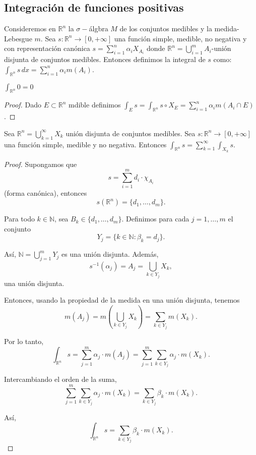 \subsection{Integración de funciones positivas}

\begin{definición}
    Consideremos en $\mathbb{R}^n$ la $\sigma-$álgbra $M$ de los conjuntos medibles y la medida-Lebesgue $m$. Sea $s: \mathbb{R}^n \to [0, +\infty]$ una función simple, medible, no negativa y con representación canónica $s = \sum_{i = 1}^{n}\alpha_iX_{A_i}$ donde $\mathbb{R}^n = \bigcup_{i = 1}^{m}A_i$-unión disjunta de conjuntos medibles. Entonces definimos la integral de $s$ como: $\int_{\mathbb{R}^n}s \, dx = \sum_{i = 1}^{n}\alpha_im(A_i)$.
\end{definición}
\begin{observación}
    $\int_{\mathbb{R}^n}0 = 0$
\end{observación}
\begin{proof}
    Dado $E \subset \mathbb{R}^n$ mdible definimos $\int_{E}s = \int_{\mathbb{R}^n}s\circ X_E = \sum_{i = 1}^{n}\alpha_im(A_i \cap E)$.
\end{proof}
\begin{lema}
    Sea $\mathbb{R}^n = \bigcup_{k = 1}^{\infty}X_k$ unión disjunta de conjuntos medibles. Sea $s: \mathbb{R}^n \to [0, +\infty]$ una función simple, medible y no negativa. Entonces $\int_{\mathbb{R}^n}s = \sum_{k = 1}^{\infty}\int_{X_k}s$.
\end{lema}
\begin{proof}
    Supongamos que 
    $$ s = \sum_{i=1}^{m} d_i \cdot \chi_{A_i} $$ 
    (forma canónica), entonces  
    $$ s(\mathbb{R}^n) = \{ d_1, \dots, d_m \}. $$
    
    Para todo $k \in \mathbb{N}$, sea $B_k \in \{ d_1, \dots, d_m \}$. Definimos para cada $j = 1, \dots, m$ el conjunto  
    $$ Y_j = \{ k \in \mathbb{N} : \beta_k = d_j \}. $$
    
    Así, $\mathbb{N} = \bigcup_{j=1}^{m} Y_j$ es una unión disjunta.  
    Además,  
    $$ s^{-1}(\alpha_j) = A_j = \bigcup_{k \in Y_j} X_k, $$ 
    una unión disjunta.
    
    Entonces, usando la propiedad de la medida en una unión disjunta, tenemos  
    $$ m(A_j) = m \left( \bigcup_{k \in Y_j} X_k \right) = \sum_{k \in Y_j} m(X_k). $$
    
    Por lo tanto,  
    $$ \int_{\mathbb{R}^n} s = \sum_{j=1}^{m} \alpha_j \cdot m(A_j) = \sum_{j=1}^{m} \sum_{k \in Y_j} \alpha_j \cdot m(X_k). $$
    
    Intercambiando el orden de la suma,  
    $$ \sum_{j=1}^{m} \sum_{k \in Y_j} \alpha_j \cdot m(X_k) = \sum_{k \in Y_j} \beta_k \cdot m(X_k). $$
    
    Así,  
    $$ \int_{\mathbb{R}^n} s = \sum_{k \in Y_j} \beta_k \cdot m(X_k). $$
\end{proof}
